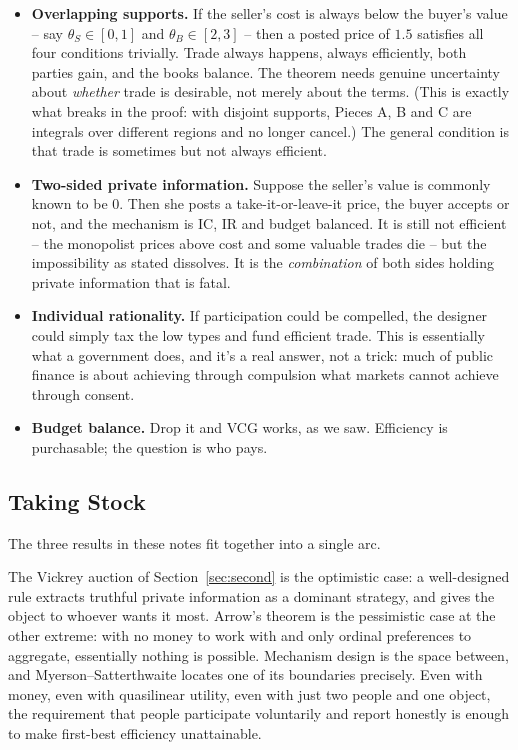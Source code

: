 \documentclass[12pt]{article}
\theoremstyle{definition}
\theoremstyle{remark}
\theoremstyle{plain}                          %
\begin{document}
\begin{itemize}[topsep=4pt]
    \item \textbf{Overlapping supports.} If the seller's cost is always below the buyer's value -- say $\theta_S \in [0,1]$ and $\theta_B \in [2,3]$ -- then a posted price of $1.5$ satisfies all four conditions trivially. Trade always happens, always efficiently, both parties gain, and the books balance. The theorem needs genuine uncertainty about \emph{whether} trade is desirable, not merely about the terms. (This is exactly what breaks in the proof: with disjoint supports, Pieces A, B and C are integrals over different regions and no longer cancel.) The general condition is that trade is sometimes but not always efficient.
    \item \textbf{Two-sided private information.} Suppose the seller's value is commonly known to be $0$. Then she posts a take-it-or-leave-it price, the buyer accepts or not, and the mechanism is IC, IR and budget balanced. It is still not efficient -- the monopolist prices above cost and some valuable trades die -- but the impossibility as stated dissolves. It is the \emph{combination} of both sides holding private information that is fatal.
    \item \textbf{Individual rationality.} If participation could be compelled, the designer could simply tax the low types and fund efficient trade. This is essentially what a government does, and it's a real answer, not a trick: much of public finance is about achieving through compulsion what markets cannot achieve through consent.
    \item \textbf{Budget balance.} Drop it and VCG works, as we saw. Efficiency is purchasable; the question is who pays.
\end{itemize}
 
\subsection{Taking Stock}
 
The three results in these notes fit together into a single arc.
 
The Vickrey auction of Section~\ref{sec:second} is the optimistic case: a well-designed rule extracts truthful private information as a dominant strategy, and gives the object to whoever wants it most. Arrow's theorem is the pessimistic case at the other extreme: with no money to work with and only ordinal preferences to aggregate, essentially nothing is possible. Mechanism design is the space between, and Myerson--Satterthwaite locates one of its boundaries precisely. Even with money, even with quasilinear utility, even with just two people and one object, the requirement that people participate voluntarily and report honestly is enough to make first-best efficiency unattainable.
 
\end{document}
